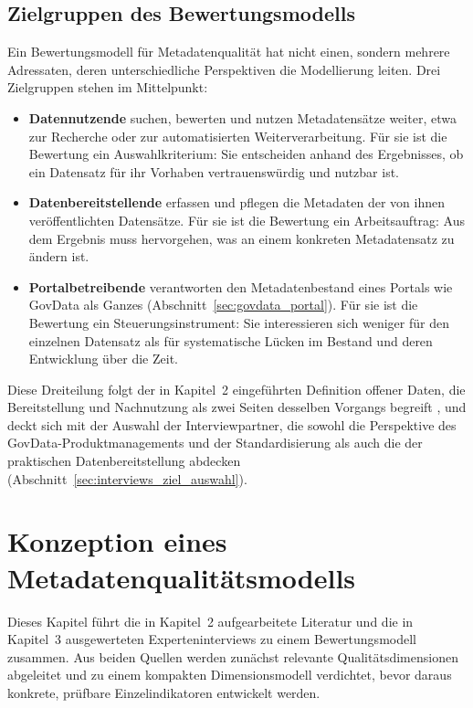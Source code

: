 \section{Zielgruppen des Bewertungsmodells}
\label{subsec:zielgruppen}

Ein Bewertungsmodell für Metadatenqualität hat nicht einen, sondern mehrere Adressaten, deren unterschiedliche Perspektiven die Modellierung leiten. Drei Zielgruppen stehen im Mittelpunkt:

\begin{itemize}
    \item \textbf{Datennutzende} suchen, bewerten und nutzen Metadatensätze weiter, etwa zur Recherche oder zur automatisierten Weiterverarbeitung. Für sie ist die Bewertung ein Auswahlkriterium: Sie entscheiden anhand des Ergebnisses, ob ein Datensatz für ihr Vorhaben vertrauenswürdig und nutzbar ist.
    \item \textbf{Datenbereitstellende} erfassen und pflegen die Metadaten der von ihnen veröffentlichten Datensätze. Für sie ist die Bewertung ein Arbeitsauftrag: Aus dem Ergebnis muss hervorgehen, was an einem konkreten Metadatensatz zu ändern ist.
    \item \textbf{Portalbetreibende} verantworten den Metadatenbestand eines Portals wie GovData als Ganzes (Abschnitt~\ref{sec:govdata_portal}). Für sie ist die Bewertung ein Steuerungsinstrument: Sie interessieren sich weniger für den einzelnen Datensatz als für systematische Lücken im Bestand und deren Entwicklung über die Zeit.
\end{itemize}

Diese Dreiteilung folgt der in Kapitel~2 eingeführten Definition offener Daten, die Bereitstellung und Nachnutzung als zwei Seiten desselben Vorgangs begreift \cite{Ubaldi2013OGD, OECD2020OURdata}, und deckt sich mit der Auswahl der Interviewpartner, die sowohl die Perspektive des GovData-Produktmanagements und der Standardisierung als auch die der praktischen Datenbereitstellung abdecken (Abschnitt~\ref{sec:interviews_ziel_auswahl}).

\pagebreak

\chapter{Konzeption eines \\ Metadatenqualitätsmodells}
\label{sec:chapter_04}

Dieses Kapitel führt die in Kapitel~2 aufgearbeitete Literatur und die in Kapitel~3 ausgewerteten Experteninterviews zu einem Bewertungsmodell zusammen. Aus beiden Quellen werden zunächst relevante Qualitätsdimensionen abgeleitet und zu einem kompakten Dimensionsmodell verdichtet, bevor daraus konkrete, prüfbare Einzelindikatoren entwickelt werden.

